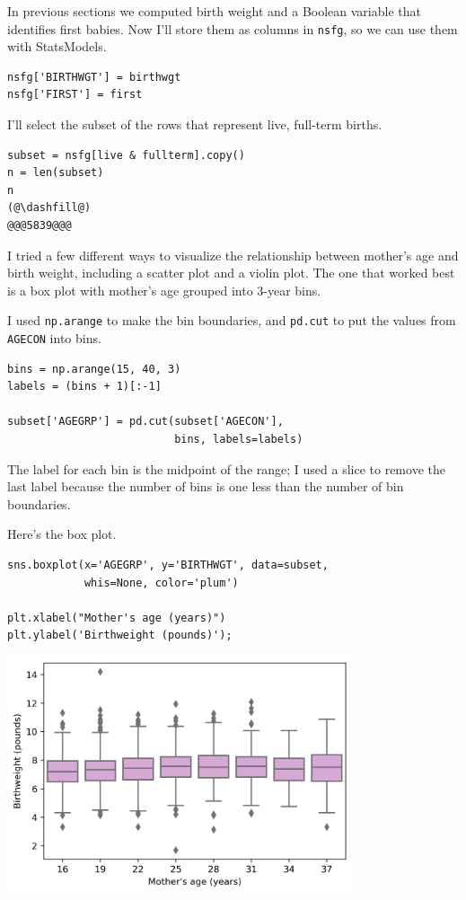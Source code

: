 In previous sections we computed birth weight and a Boolean variable
that identifies first babies. Now I'll store them as columns in
\passthrough{\lstinline!nsfg!}, so we can use them with StatsModels.

\begin{lstlisting}[]
nsfg['BIRTHWGT'] = birthwgt
nsfg['FIRST'] = first
\end{lstlisting}

I'll select the subset of the rows that represent live, full-term
births.

\begin{lstlisting}[]
subset = nsfg[live & fullterm].copy()
n = len(subset)
n
(@\dashfill@)
@@@5839@@@
\end{lstlisting}

I tried a few different ways to visualize the relationship between
mother's age and birth weight, including a scatter plot and a violin
plot. The one that worked best is a box plot with mother's age grouped
into 3-year bins.

I used \passthrough{\lstinline!np.arange!} to make the bin boundaries,
and \passthrough{\lstinline!pd.cut!} to put the values from
\passthrough{\lstinline!AGECON!} into bins.

\begin{lstlisting}[]
bins = np.arange(15, 40, 3)
labels = (bins + 1)[:-1]

subset['AGEGRP'] = pd.cut(subset['AGECON'], 
                          bins, labels=labels)
\end{lstlisting}

The label for each bin is the midpoint of the range; I used a slice to
remove the last label because the number of bins is one less than the
number of bin boundaries.

Here's the box plot.

\begin{lstlisting}[]
sns.boxplot(x='AGEGRP', y='BIRTHWGT', data=subset, 
            whis=None, color='plum')

plt.xlabel("Mother's age (years)")
plt.ylabel('Birthweight (pounds)');
\end{lstlisting}

\begin{center}
\includegraphics[width=4in]{chapters/13_hypothesis_files/13_hypothesis_118_0.png}
\end{center}

